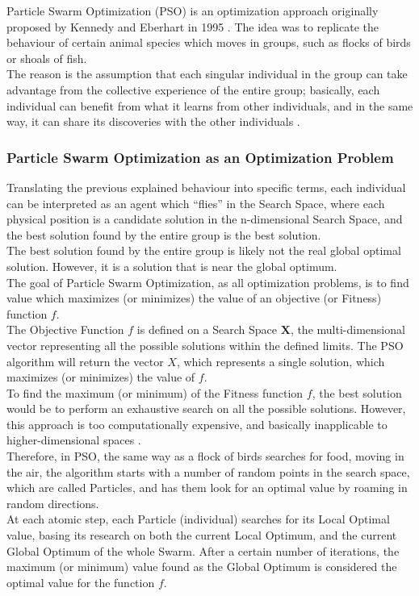 Particle Swarm Optimization (PSO) is an optimization approach originally proposed by Kennedy and Eberhart in 1995 \cite{Tesi-3.3}. The idea was to replicate the behaviour of certain animal species which moves in groups, such as flocks of birds or shoals of fish.
\\[0.3cm]The reason is the assumption that each singular individual in the group can take advantage from the collective experience of the entire group; basically, each individual can benefit from what it learns from other individuals, and in the same way, it can share its discoveries with the other individuals \cite{Tesi-3.1}.

\subsubsection{Particle Swarm Optimization as an Optimization Problem}

Translating the previous explained behaviour into specific terms, each individual can be interpreted as an agent which “flies” in the Search Space, where each physical position is a candidate solution in the n-dimensional Search Space, and the best solution found by the entire group is the best solution.
\\[0.3cm]The best solution found by the entire group is likely not the real global optimal solution. However, it is a solution that is near the global optimum.
% 
\\[0.3cm]The goal of Particle Swarm Optimization, as all optimization problems, is to find value which maximizes (or minimizes) the value of an objective (or Fitness) function $f$.
\\[0.3cm]The Objective Function $f$ is defined on a Search Space {$\textbf{X}$}, the multi-dimensional vector representing all the possible solutions within the defined limits.
The PSO algorithm will return the vector $X$, which represents a single solution, which maximizes (or minimizes) the value of $f$.
% 
\\[0.3cm]To find the maximum (or minimum) of the Fitness function $f$, the best solution would be to perform an exhaustive search on all the possible solutions. However, this approach is too computationally expensive, and basically inapplicable to higher-dimensional spaces \cite{Tesi-3.1}.
\\[0.3cm]Therefore, in PSO, the same way as a flock of birds searches for food, moving in the air, the algorithm starts with a number of random points in the search space, which are called Particles, and has them look for an optimal value by roaming in random directions.
\\[0.3cm]At each atomic step, each Particle (individual) searches for its Local Optimal value, basing its research on both the current Local Optimum, and the current Global Optimum of the whole Swarm.
After a certain number of iterations, the maximum (or minimum) value found as the Global Optimum is considered the optimal value for the function $f$.

